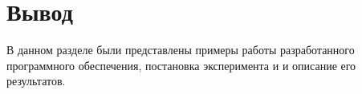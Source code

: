 \section*{Вывод}
В данном разделе были представлены примеры работы разработанного программного обеспечения, постановка эксперимента и и описание его результатов.

